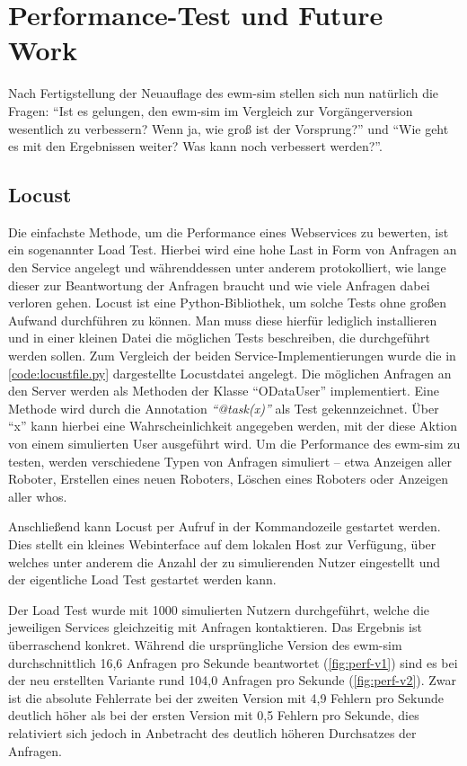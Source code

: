 \chapter{Performance-Test und Future Work}
Nach Fertigstellung der Neuauflage des \ac{ewm-sim} stellen sich nun natürlich die Fragen: \enquote{Ist es gelungen, den \ac{ewm-sim} im Vergleich zur Vorgängerversion wesentlich zu verbessern? Wenn ja, wie groß ist der Vorsprung?} und \enquote{Wie geht es mit den Ergebnissen weiter? Was kann noch verbessert werden?}.

\section{Locust}
Die einfachste Methode, um die Performance eines Webservices zu bewerten, ist ein sogenannter Load Test.
Hierbei wird eine hohe Last in Form von Anfragen an den Service angelegt und währenddessen unter anderem protokolliert, wie lange dieser zur Beantwortung der Anfragen braucht und wie viele Anfragen dabei verloren gehen.
Locust ist eine Python-Bibliothek, um solche Tests ohne großen Aufwand durchführen zu können.
Man muss diese hierfür lediglich installieren und in einer kleinen Datei die möglichen Tests beschreiben, die durchgeführt werden sollen.
Zum Vergleich der beiden Service-Implementierungen wurde die in \autoref{code:locustfile.py} dargestellte Locustdatei angelegt.
Die möglichen Anfragen an den Server werden als Methoden der Klasse \enquote{ODataUser} implementiert.
Eine Methode wird durch die Annotation \emph{\enquote{@task(x)}} als Test gekennzeichnet.
Über \enquote{x} kann hierbei eine Wahrscheinlichkeit angegeben werden, mit der diese Aktion von einem simulierten User ausgeführt wird.
Um die Performance des \ac{ewm-sim} zu testen, werden verschiedene Typen von Anfragen simuliert -- etwa Anzeigen aller Roboter, Erstellen eines neuen Roboters, Löschen eines Roboters oder Anzeigen aller \ac{who}s.



Anschließend kann Locust per Aufruf in der Kommandozeile gestartet werden.
Dies stellt ein kleines Webinterface auf dem lokalen Host zur Verfügung, über welches unter anderem die Anzahl der zu simulierenden Nutzer eingestellt und der eigentliche Load Test gestartet werden kann.

Der Load Test wurde mit 1000 simulierten Nutzern durchgeführt, welche die jeweiligen Services gleichzeitig mit Anfragen kontaktieren.
Das Ergebnis ist überraschend konkret.
Während die ursprüngliche Version des \ac{ewm-sim} durchschnittlich 16,6 Anfragen pro Sekunde beantwortet (\autoref{fig:perf-v1}) sind es bei der neu erstellten Variante rund 104,0 Anfragen pro Sekunde (\autoref{fig:perf-v2}).
Zwar ist die absolute Fehlerrate bei der zweiten Version mit 4,9 Fehlern pro Sekunde deutlich höher als bei der ersten Version mit 0,5 Fehlern pro Sekunde, dies relativiert sich jedoch in Anbetracht des deutlich höheren Durchsatzes der Anfragen.

